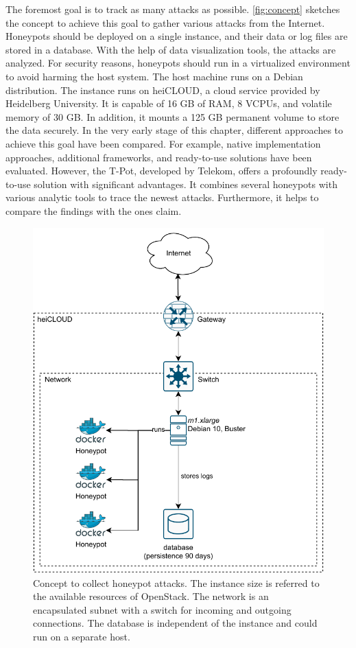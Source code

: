 The foremost goal is to track as many attacks as possible.
\autoref{fig:concept} sketches the concept to achieve this goal to gather various attacks from the Internet.
Honeypots should be deployed on a single instance, and their data or log files are stored in a database.
With the help of data visualization tools, the attacks are analyzed.
For security reasons, honeypots should run in a virtualized environment to avoid harming the host system.
The host machine runs on a Debian distribution.
The instance runs on heiCLOUD, a cloud service provided by Heidelberg University.
It is capable of 16 GB of RAM, 8 VCPUs, and volatile memory of 30 GB.
In addition, it mounts a 125 GB permanent volume to store the data securely.
In the very early stage of this chapter, different approaches to achieve this goal have been compared.
For example, native implementation approaches, additional frameworks, and ready-to-use solutions have been evaluated.
However, the T-Pot, developed by Telekom, offers a profoundly ready-to-use solution with significant advantages.
It combines several honeypots with various analytic tools to trace the newest attacks.
Furthermore, it helps to compare the findings with the ones \citet{Kelly2021} claim.

\begin{figure}
    \centering
    \includegraphics{figures/tpot-concept.pdf}
    \caption[Concept to collect honeypot attacks]{
        Concept to collect honeypot attacks.
        The instance size is referred to the available resources of OpenStack.
        The network is an encapsulated subnet with a switch for incoming and outgoing connections.
        The database is independent of the instance and could run on a separate host.
    }
    \label{fig:concept}
\end{figure}

